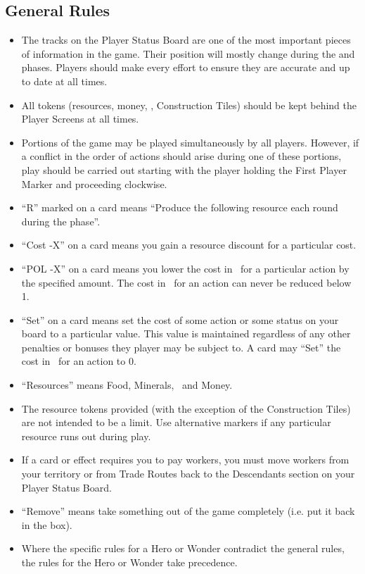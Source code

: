 \documentclass[10pt,twocolumn]{article}
\begin{document}
\subsection{General Rules}
\begin{itemize}
\item The tracks on the Player Status Board are one of the most important pieces of information in the game. Their position will mostly change during the  and  phases. Players should make every effort to ensure they are accurate and up to date at all times.

\item All tokens (resources, money, \vps, Construction Tiles) should be kept behind the Player Screens at all times.
\iftoggle{original-rules}{
\item A player may not have fewer than 0 \vps.
}{
\item A player may not have less than 0 \vps.
}
\item Portions of the game may be played simultaneously by all players. However, if a conflict in the order of actions should arise during one of these portions, play should be carried out starting with the player holding the First Player Marker and proceeding clockwise.

\item ``R'' marked on a card means ``Produce the following resource each round during the  phase''.

\item ``Cost -X'' on a card means you gain a resource discount for a particular cost.

\item ``POL -X'' on a card means you lower the cost in \polf\ for a particular action by the specified amount. The cost in \polf\ for an action can never be reduced below 1.

\item ``Set'' on a card means set the cost of some action or some status on your board to a particular value. This value is maintained regardless of any other penalties or bonuses they player may be subject to. A card may ``Set'' the cost in \polf\ for an action to 0.

\item ``Resources'' means Food, Minerals, \vps\ and Money.

\item The resource tokens provided (with the exception of the Construction Tiles) are not intended to be a limit. Use alternative markers if any particular resource runs out during play.

\item If a card or effect requires you to pay workers, you must move workers from your territory or from Trade Routes back to the Descendants section on your Player Status Board.

\item ``Remove'' means take something out of the game completely (i.e. put it back in the box).
\item Where the specific rules for a Hero or Wonder contradict the general rules, the rules for the Hero or Wonder take precedence.
\end{itemize}
\end{document}

